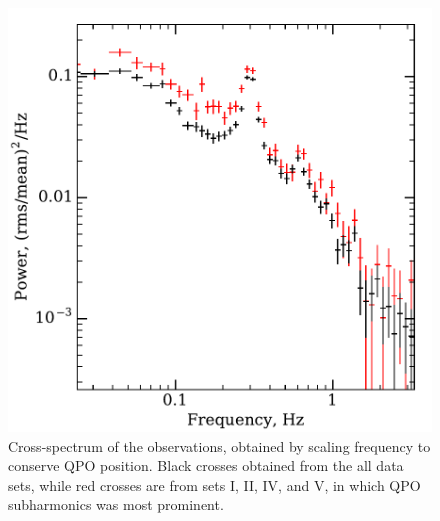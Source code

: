 \documentclass[a4paper,fleqn,usenatbib]{mnras}
\begin{document}
\begin{figure}
        \includegraphics[width=\columnwidth]{folded_cospectr2.pdf}
        \caption{Cross-spectrum of the observations, obtained by scaling frequency to conserve QPO position.
        Black crosses obtained from the all data sets, while red crosses are from sets I, II, IV, and V, in which QPO subharmonics was most prominent.}
        \label{fig:cospec_tracked}
\end{figure}
\end{document}
